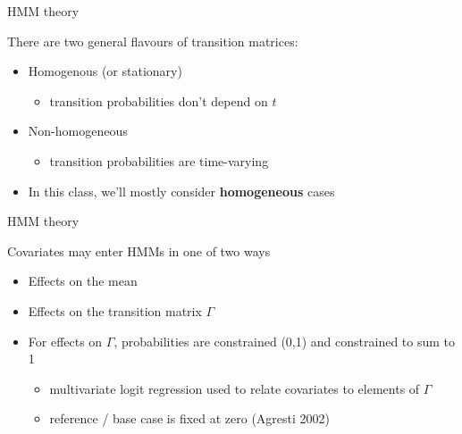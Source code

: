 \documentclass[
  ignorenonframetext,
]{beamer}
\providecommand{\tightlist}{%
  \setlength{\itemsep}{0pt}\setlength{\parskip}{0pt}}
\begin{document}
\begin{frame}{HMM theory}
\protect\hypertarget{hmm-theory-3}{}

There are two general flavours of transition matrices:

\begin{itemize}
\tightlist
\item
  Homogenous (or stationary)

  \begin{itemize}
  \tightlist
  \item
    transition probabilities don't depend on \(t\)
  \end{itemize}
\item
  Non-homogeneous

  \begin{itemize}
  \tightlist
  \item
    transition probabilities are time-varying
  \end{itemize}
\item
  In this class, we'll mostly consider \textbf{homogeneous} cases
\end{itemize}

\end{frame}

\begin{frame}{HMM theory}
\protect\hypertarget{hmm-theory-4}{}

Covariates may enter HMMs in one of two ways

\begin{itemize}
\item
  Effects on the mean
\item
  Effects on the transition matrix \(\Gamma\)
\item
  For effects on \(\Gamma\), probabilities are constrained (0,1) and
  constrained to sum to 1

  \begin{itemize}
  \tightlist
  \item
    multivariate logit regression used to relate covariates to elements
    of \(\Gamma\)
  \item
    reference / base case is fixed at zero (Agresti 2002)
  \end{itemize}
\end{itemize}

\end{frame}
\end{document}
